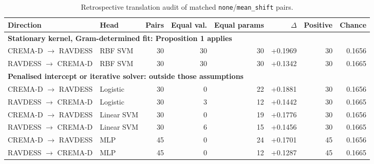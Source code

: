 \begin{table}[!t]
\centering\small
\caption{Retrospective translation audit of matched \texttt{none}/\texttt{mean\_shift} pairs.}
\label{tab:translation-audit}
\begin{tabular}{llrrrrrr}
\toprule
Direction & Head & Pairs & Equal val. & Equal params & $\Delta$ & Positive & Chance \\
\midrule
\multicolumn{8}{l}{\textbf{Stationary kernel, Gram-determined fit: Proposition 1 applies}} \\
CREMA-D $\to$ RAVDESS & RBF SVM & 30 & 30 & 30 & +0.1969 & 30 & 0.1656 \\
RAVDESS $\to$ CREMA-D & RBF SVM & 30 & 30 & 30 & +0.1342 & 30 & 0.1665 \\
\midrule
\multicolumn{8}{l}{\textbf{Penalised intercept or iterative solver: outside those assumptions}} \\
CREMA-D $\to$ RAVDESS & Logistic & 30 & 0 & 22 & +0.1881 & 30 & 0.1656 \\
RAVDESS $\to$ CREMA-D & Logistic & 30 & 3 & 12 & +0.1442 & 30 & 0.1665 \\
CREMA-D $\to$ RAVDESS & Linear SVM & 30 & 0 & 19 & +0.1776 & 30 & 0.1656 \\
RAVDESS $\to$ CREMA-D & Linear SVM & 30 & 6 & 15 & +0.1456 & 30 & 0.1665 \\
CREMA-D $\to$ RAVDESS & MLP & 45 & 0 & 24 & +0.1701 & 45 & 0.1656 \\
RAVDESS $\to$ CREMA-D & MLP & 45 & 0 & 12 & +0.1287 & 45 & 0.1665 \\
\bottomrule
\end{tabular}
\end{table}
